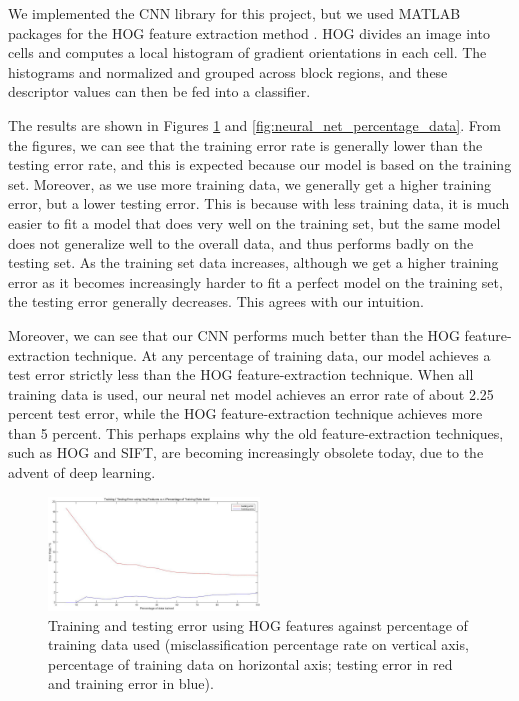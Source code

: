 \documentclass[10pt,twocolumn]{article}
\begin{document}
We implemented the CNN library for this project, but we used MATLAB packages for the HOG feature extraction method \cite{matlabhog}. HOG divides an image into cells and computes a local histogram of gradient orientations in each cell. The histograms and normalized and grouped across block regions, and these descriptor values can then be fed into a classifier.

The results are shown in Figures \ref{fig:hog} and \ref{fig:neural_net_percentage_data}. From the figures, we can see that the training error rate is generally lower than the testing error rate, and this is expected because our model is based on the training set. Moreover, as we use more training data, we generally get a higher training error, but a lower testing error. This is because with less training data, it is much easier to fit a model that does very well on the training set, but the same model does not generalize well to the overall data, and thus performs badly on the testing set. As the training set data increases, although we get a higher training error as it becomes increasingly harder to fit a perfect model on the training set, the testing error generally decreases. This agrees with our intuition.

Moreover, we can see that our CNN performs much better than the HOG feature-extraction technique. At any percentage of training data, our model achieves a test error strictly less than the HOG feature-extraction technique. When all training data is used, our neural net model achieves an error rate of about 2.25 percent test error, while the HOG feature-extraction technique achieves more than 5 percent. This perhaps explains why the old feature-extraction techniques, such as HOG and SIFT, are becoming increasingly obsolete today, due to the advent of deep learning.

\begin{figure}
\includegraphics[width = 0.5\textwidth]{figure/hog}
\caption{Training and testing error using HOG features against percentage of training data used (misclassification percentage rate on vertical axis, percentage of training data on horizontal axis; testing error in red and training error in blue).}
\label{fig:hog}
\end{figure}
\end{document}

